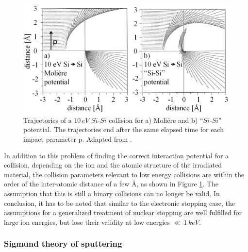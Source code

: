 \begin{figure}
	\centering
		\includegraphics[width=.75\textwidth]{images/SiSicollision.png}
	\caption{Trajectories of a $10\,eV$ $Si$-$Si$ collision for a) Moliére and b) ``$Si$-$Si$'' potential. The trajectories end after the same elapsed time for each impact parameter p. Adapted from \cite{eckstein_computer_1991}.}
	\label{SiSi}
\end{figure} 

In addition to this problem of finding the correct interaction potential for a collision, depending on the ion and the atomic structure of the irradiated material, the collision parameters relevant to low energy collisions are within the order of the inter-atomic distance of a few \AA, as shown in Figure \ref{SiSi}. The assumption that this is still a binary collisions can no longer be valid. In conclusion, it has to be noted that similar to the electronic stopping case, the assumptions for a generalized treatment of nuclear stopping are well fulfilled for large ion energies, but lose their validity at low energies $\ll\,1\,keV$.

\subsubsection{Sigmund theory of sputtering}

